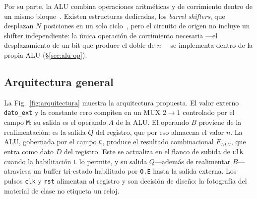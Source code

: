 \documentclass[llncs]{llncs}
\begin{document}
Por su parte, la ALU combina operaciones aritméticas y de corrimiento
dentro de un mismo bloque~\cite{rabaey2002dic}. Existen estructuras
dedicadas, los \emph{barrel shifters}, que desplazan $N$ posiciones en un
solo ciclo~\cite{katz2005cld}, pero el circuito de origen no incluye un
shifter independiente: la única operación de corrimiento necesaria ---el
desplazamiento de un bit que produce el doble de $n$--- se implementa
dentro de la propia ALU (§\ref{sec:alu-op}).

\subsection{Arquitectura general}
\label{sec:arquitectura}

La Fig.~\ref{fig:arquitectura} muestra la arquitectura propuesta. El valor
externo \texttt{dato\_ext} y la constante cero compiten en un MUX $2\to1$
controlado por el campo \texttt{M}; su salida es el operando $A$ de la ALU.
El operando $B$ proviene de la realimentación: es la salida $Q$ del
registro, que por eso almacena el valor $n$. La ALU, gobernada por el campo
\texttt{C}, produce el resultado combinacional $F_{ALU}$, que entra como
dato $D$ del registro. Este se actualiza en el flanco de subida de
\texttt{clk} cuando la habilitación \texttt{L} lo permite, y su salida
$Q$---además de realimentar $B$---atraviesa un buffer tri-estado
habilitado por \texttt{O.E} hasta la salida externa. Los pulsos
\texttt{clk} y \texttt{rst} alimentan al registro y son decisión de
diseño: la fotografía del material de clase no etiqueta un reloj.
\end{document}
